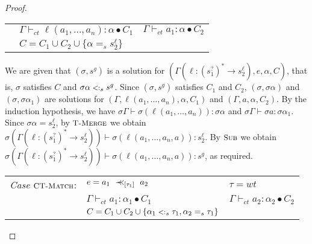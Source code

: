 \documentclass{eptcs}
\newcommand{\ih}{induction hypothesis\xspace}
\newcommand{\CC}{\ensuremath{C}\xspace}
\newcommand{\match}{\mathrel{\mbox{$\prec\hspace{-0.5em}\prec$}}}
\newcommand{\TMerge}{{\small \textsc{T-Merge}}}
\newcommand{\Sub}{{\small \textsc{Sub}}}
\newcommand{\CTMatch}{{\small \textsc{CT-Match}}}
\newcommand{\sub}{\mathrel{\mbox{{\footnotesize $<:$}}}}
\newcommand{\wt}[0]{{\ensuremath{wt}}}
\newcommand{\ctvdash}{\ensuremath{\vdash_{ct}}}
\newcommand{\vsig}[2]{\ensuremath{{#1}^*\rightarrow{#2}}}
\begin{document}
\begin{proof}
\begin{flushleft}
\begin{tabular}{lll}
                                & $\Gamma \ctvdash \ell(a_1,\ldots,a_n) : \alpha
                                \bullet \CC_1$                  
                                & $\Gamma \ctvdash a_1 : \alpha \bullet
                                \CC_2$                                  \\
                                
                                & $\CC = \CC_1 \cup \CC_2 \cup \{\alpha =_s
s_2^{\ell}\}$&  \\ 
\end{tabular}
\end{flushleft}

We are given that $(\sigma,s^g)$ is a solution for $(\Gamma(\ell :
\vsig{(s_1^?)}{s_2^{\ell}}), e, \alpha, \CC)$, that is, $\sigma$ satisfies $\CC$ and
$\sigma\alpha \sub_s s^g$. Since $(\sigma,s^g)$ satisfies $\CC_1$ and $\CC_2$,
$(\sigma, \sigma\alpha)$ and $(\sigma, \sigma\alpha_1)$ are solutions for
$(\Gamma, \ell(a_1,\ldots,a_n), \alpha, \CC_1)$ and $(\Gamma,a,\alpha,\CC_2)$.
By the \ih, we have $\sigma\Gamma \vdash \sigma(\ell(a_1,\ldots,a_n)): \sigma\alpha$ and
$\sigma\Gamma \vdash \sigma a : \sigma\alpha_1$. Since $\sigma\alpha =
s_2^{\ell}$, by
$\TMerge$ we obtain $\sigma(\Gamma(\ell : \vsig{(s_1^?)}{s_2^{\ell}})) \vdash
\sigma(\ell(a_1, \dots, a_n,
a)) : s_2^{\ell}$. By $\Sub$ we
obtain  $\sigma(\Gamma(\ell : \vsig{(s_1^?)}{s_2^{\ell}})) \vdash \sigma(\ell(a_1, \dots, a_n,
a)) : s^g$, as required.

\begin{flushleft}
\begin{tabular}{lll}
        \textit{Case} $\CTMatch$:       & $e = a_1 ~\match_{[\tau_1]}~ a_2$
                                & $\tau = \wt$                  \\
                                
                                & $\Gamma \ctvdash a_1 : \alpha_1 \bullet \CC_1$                        
                                & $\Gamma \ctvdash a_2 : \alpha_2 \bullet \CC_2$                                        \\
                                
                                & $\CC = \CC_1 \cup \CC_2 \cup \{\alpha_1 \sub_s
\tau_1, \alpha_2 =_s \tau_1\}$&   \\ 
\end{tabular}
\end{flushleft}


\end{proof}
\end{document}
